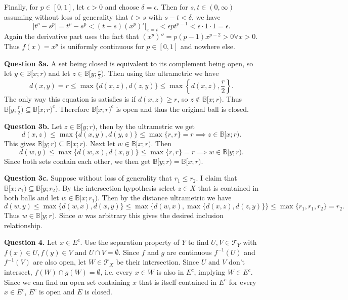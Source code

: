 \documentclass[letterpaper, reqno,11pt]{article}
\begin{document}
Finally, for $p\in [0,1]$, let $\epsilon>0$ and choose $\delta=\epsilon$. Then for $s,t\in (0,\infty)$ assuming without loss of generality that $t>s$ with $s-t<\delta$, we have
\[
|t ^{p}-s^{p}|=t ^{p}-s^{p}< (t-s) (x^{p})'\big|_{x=t}<\epsilon p t^{p-1}<\epsilon\cdot 1\cdot 1=\epsilon
.\]
Again the derivative part uses the fact that $(x^{p})''=p(p-1)x^{p-2}>0\forall x>0$. Thus $f(x)=x^{p}$ is uniformly continuous for $p\in[0,1]$ and nowhere else.

\newpage\phantom{blabla}
\newpage

{\medskip\noindent\bf Question 3a.} A set being closed is equivalent to its complement being open, so let $y\in \mathbb B[x;r)$ and let $z\in \mathbb B[y;\frac{r}{2})$. Then using the ultrametric we have
\[
d(x,y)=r\leq \max \{d(x,z), d(z,y)\}\leq \max \left\{d(x,z), \frac{r}{2}\right\}
.\]
The only way this equation is satisfies is if $d(x,z)\geq r$, so $z\notin \mathbb B[x;r)$. Thus $\mathbb B[y;\frac{r}{2})\subseteq \mathbb B[x;r)^{c}$. Therefore $\mathbb B[x;r)^{c}$ is open and thus the original ball is closed.

{\medskip\noindent\bf Question 3b.} Let $z\in \mathbb B[y;r)$, then by the ultrametric we get
\[
d(x,z)\leq \max \{d(x,y),d(y,z)\}\leq \max \{r,r\}=r\implies z\in \mathbb B[x;r)
.\]
This gives $\mathbb B[y;r)\subseteq \mathbb B[x;r)$. Next let $w\in \mathbb B[x;r)$. Then 
\[
d(w,y)\leq \max \{d(w,x), d(x,y)\}\leq \max \{r,r\}=r\implies w\in \mathbb B[y;r)
.\]
Since both sets contain each other, we then get $\mathbb B[y;r)=\mathbb B[x;r)$.

{\medskip\noindent\bf Question 3c.} Suppose without loss of generality that $r_1\leq r_2$. I claim that $\mathbb B[x;r_1)\subseteq \mathbb B[y;r_2)$. By the intersection hypothesis select $z\in X$ that is contained in both balls and let $w\in \mathbb B[x;r_1)$. Then by the distance ultrametric we have
\[
d(w,y)\leq \max \{d(w,x), d(x,y)\}\leq \max \{d(w,x), \max \{d(x,z), d(z,y)\}\}\leq \max \{r_1,r_1,r_2\}=r_2
.\]
Thus $w\in \mathbb B[y;r)$. Since $w$ was arbitrary this gives the desired inclusion relationship.

\newpage\phantom{blabla}
\newpage

{\medskip\noindent\bf Question 4.} Let $x\in E^{c}$. Use the separation property of $Y$ to find $U,V\in \mathcal T_Y$ with $f(x)\in U, f(y)\in V$ and $U\cap V=\emptyset$. Since $f$ and $g$ are continuous $f^{-1}(U)$ and $f^{-1}(V)$ are also open, let $W\in \mathcal T_X$ be their intersection. Since $U$ and $V$ don't intersect, $f(W)\cap g(W)=\emptyset$, i.e. every $x\in W$ is also in $E^{c}$, implying $W\in E^{c}$. Since we can find an open set containing $x$ that is itself contained in $E^{c}$ for every $x\in E^{c}$, $E^{c}$ is open and $E$ is closed.
\end{document}
